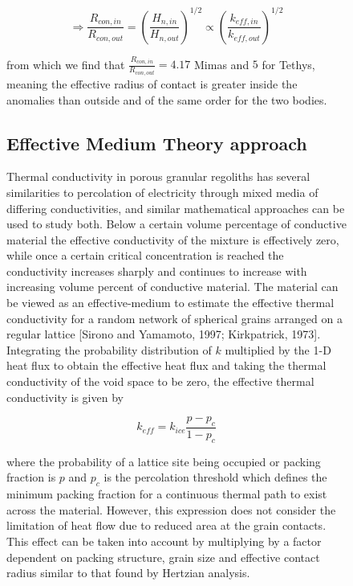 \documentclass[11pt]{article} %
\begin{document}
\begin{figure}[ht]
\begin{Table}
	\begin{equation}
	\Rightarrow \frac{R_{con,in}}{R_{con,out}} = (\frac{H_{n, in}}{H_{n, out}})^{1/2} \varpropto \left( \frac{k_{eff,in}}{k_{eff,out}} \right)^{1/2}
	\end{equation}
	
	from which we find that $\frac{R_{con,in}}{R_{con,out}} = 4.17$ Mimas and $5$ for Tethys, meaning the effective radius of contact is greater inside the anomalies than outside and of the same order for the two bodies.
	
\subsection{Effective Medium Theory approach}

	Thermal conductivity in porous granular regoliths has several similarities to percolation of electricity through mixed media of differing conductivities, and similar mathematical approaches can be used to study both. Below a certain volume percentage of conductive material the effective conductivity of the mixture is effectively zero, while once a certain critical concentration is reached the conductivity increases sharply and continues to increase with increasing volume percent of conductive material. The material can be viewed as an effective-medium to estimate the effective thermal conductivity for a random network of spherical grains arranged on a regular lattice  [Sirono and Yamamoto, 1997; Kirkpatrick, 1973]. Integrating the probability distribution of $k$ multiplied by the 1-D heat flux to obtain the effective heat flux and taking the thermal conductivity of the void space to be zero, the effective thermal conductivity is given by
	
	\begin{equation}
	k_{eff} = k_{ice} \frac{p - p_{c}}{1 - p_{c}}
	\end{equation}

	where the probability of a lattice site being occupied or packing fraction is $p$ and $p_{c}$ is the percolation threshold which defines the minimum packing fraction for a continuous thermal path to exist across the material. However, this expression does not consider the limitation of heat flow due to reduced area at the grain contacts. This effect can be taken into account by multiplying by a factor dependent on packing structure, grain size and effective contact radius similar to that found by Hertzian analysis.
	 

\end{Table}
\end{figure}
\end{document}
